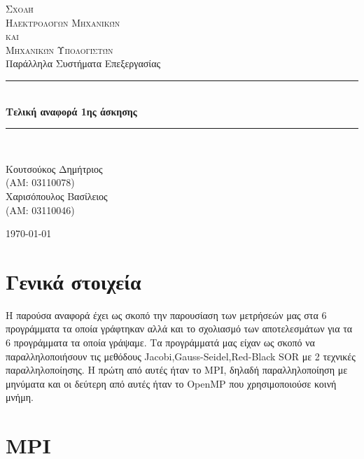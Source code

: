 \documentclass[11pt,a4paper]{article}
\newcommand{\HRule}{\rule{\linewidth}{0.5mm}}
\begin{document}
\begin{titlepage}
\centering


\textsc{\LARGE Σχολή \\ Ηλεκτρολόγων Μηχανικών \\[-3pt] και \\[6pt] Μηχανικών Υπολογιστών}\\[1.5cm]
{\Large Παράλληλα Συστήματα Επεξεργασίας}\\[0.5cm]

\HRule \\[0.5cm]
{\huge \bfseries Τελική αναφορά 1ης άσκησης}\\[0.2cm]
\HRule \\[1.5cm]

\begin{minipage}{0.4\textwidth}
\large
Κουτσούκος Δημήτριος \\
(ΑΜ: 03110078) \\
Χαρισόπουλος Βασίλειος \\
(ΑΜ: 03110046)
\end{minipage}

\vfill

{\large \today}
\end{titlepage}

\clearpage
\clearpage
\newpage
\section*{Γενικά στοιχεία}
Η παρούσα αναφορά έχει ως σκοπό την παρουσίαση των μετρήσεών μας στα 6 προγράμματα τα οποία γράφτηκαν αλλά και το σχολιασμό των αποτελεσμάτων για τα 6 προγράμματα
τα οποία γράψαμε. Τα προγράμματά μας είχαν ως σκοπό να παραλληλοποιήσουν τις μεθόδους Jacobi,Gauss-Seidel,Red-Black SOR με 2 τεχνικές παραλληλοποίησης. Η πρώτη από
αυτές ήταν το MPI, δηλαδή παραλληλοποίηση με μηνύματα και οι δεύτερη από αυτές ήταν το OpenMP που χρησιμοποιούσε κοινή μνήμη.
\section*{MPI}
\end{document}

